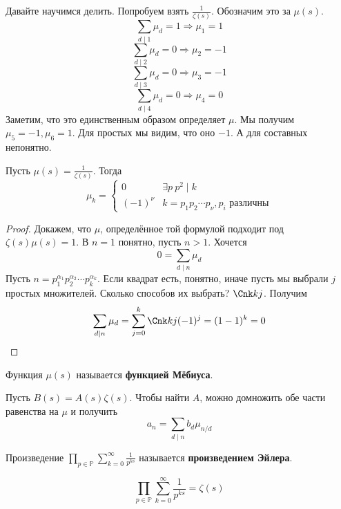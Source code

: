 \documentclass{article}
\begin{document}
    \begin{remark}
        Давайте научимся делить. Попробуем взять $\frac1{\zeta(s)}$. Обозначим это за $\mu(s)$.
        $$
        \sum\limits_{d\mathrel|1}\mu_d=1\Rightarrow\mu_1=1
        $$
        $$
        \sum\limits_{d\mathrel|2}\mu_d=0\Rightarrow\mu_2=-1
        $$
        $$
        \sum\limits_{d\mathrel|3}\mu_d=0\Rightarrow\mu_3=-1
        $$
        $$
        \sum\limits_{d\mathrel|4}\mu_d=0\Rightarrow\mu_4=0
        $$
        Заметим, что это единственным образом определяет $\mu$. Мы получим $\mu_5=-1,\mu_6=1$. Для простых мы видим, что оно $-1$. А для составных непонятно.
    \end{remark}
    \begin{theorem}
        Пусть $\mu(s)=\frac1{\zeta(s)}$. Тогда
        $$
        \mu_k=\begin{cases}
            0 & \exists p~p^2\mathrel|k\\
            (-1)^\nu & k=p_1p_2\cdots p_\nu,p_i\text{ различны}
        \end{cases}
        $$
    \end{theorem}
    \begin{proof}
        Докажем, что $\mu$, определённое той формулой подходит под $\zeta(s)\mu(s)=1$. В $n=1$ понятно, пусть $n>1$. Хочется
        $$
        0=\sum\limits_{d\mathrel|n}\mu_d
        $$
        Пусть $n=p_1^{\alpha_1}p_2^{\alpha_2}\cdots p_k^{\alpha_k}$. Если квадрат есть, понятно, иначе пусть мы выбрали $j$ простых множителей. Сколько способов их выбрать? $\Cnk kj$. Получим
        $$
        \sum\limits_{d\mathrel|n}\mu_d=\sum\limits_{j=0}^k\Cnk kj(-1)^j=(1-1)^k=0
        $$
    \end{proof}
    \begin{definition}
        Функция $\mu(s)$ называется \textbf{функцией Мёбиуса}.
    \end{definition}
    \begin{claim}
        Пусть $B(s)=A(s)\zeta(s)$. Чтобы найти $A$, можно домножить обе части равенства на $\mu$ и получить
        $$
        a_n=\sum\limits_{d\mathrel|n}b_d\mu_{n/d}
        $$
    \end{claim}
    \begin{definition}
        Произведение $\prod\limits_{p\in\mathbb P}\sum\limits_{k=0}^\infty\frac1{p^{ks}}$ называется \textbf{произведением Эйлера}.
    \end{definition}
    \begin{theorem}
        $$
        \prod\limits_{p\in\mathbb P}\sum\limits_{k=0}^\infty\frac1{p^{ks}}=\zeta(s)
        $$
    \end{theorem}
\end{document}
